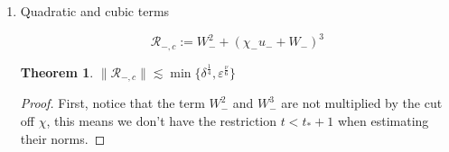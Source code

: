 \documentclass[letterpaper,11pt]{article}
\newcommand{\rmO}{\mathcal{O}}
\newcommand{\eps}{\varepsilon}
\newcommand{\lar}{ \lesssim }
\numberwithin{equation}{section}
\theoremstyle{plain}
\newtheorem{theorem}{Theorem}[section]
\begin{document}
\begin{enumerate}
\begin{itemize}
\begin{enumerate}
\begin{proof}
For $0<t<\eps^{-1}\delta$, where the weight $I(t) $ equals $[\delta^{-\frac{1}{4}} (\delta -\eps t)^{\frac{3}{2}}+\delta^{\frac{1}{4}}\eps^{\frac{2}{3}}]^{-1}$, it is convenient to write the term $T_\infty -t$ as follows:
\[
T_\infty -t = \eps^{-1}\delta + \eps^{-\frac{1}{3}}\Omega_0 - t  = \eps^{-1}\left[(\delta -\eps t) +\eps^{\frac{2}{3}}\Omega_0\right].
\]

It then follows that
\begin{align*}
|I(t)\chi_- u_+ W_+|_\infty &\lar I(t)(T_\infty - t)^{-(1+\eta)} \lar I(\eps^{-1}\delta)(T_\infty - \eps^{-1}\delta)^{-(1+\eta)} \\
&\lar \eps^{-\frac{2}{3}} \eps^{\frac{1+\eta}{3}} = \rmO(\eps^{\frac{\eta-1}{3}} ).
\end{align*}
Then we apply the claim to $I(t)\chi_-u_-W_+$
\begin{align*}
|I(t)\chi_- u_- W_+|_\infty  &\lar \frac{\sqrt{\delta-\eps t}+\eps^{1/3}}{ \delta^{-\frac{1}{4}}(\delta-\eps t)^{\frac{3}{2}} + \delta^{\frac{1}{4}}\eps^{2/3}} (T_\infty - \eps^{-1}\delta)^{-\eta} \\
& = \frac{\sqrt{\delta-\eps t}+\eps^{1/3}}{ \delta^{-\frac{1}{4}}(\delta-\eps t)^{\frac{3}{2}} + \delta^{\frac{1}{4}}\eps^{2/3}} \frac{\eps^{\eta}}{(\delta -\eps t +\eps^{\frac{2}{3}}\Omega_0)^\eta}\\
&= \dfrac{(\delta \beta)^{1/2} + \eps^{1/3}} {(\delta \beta)^{3/2} + \eps^{2/3}} \dfrac{\eps^\eta}{(\delta \beta + \eps^{2/3} \Omega_0 )^{\eta} }\\
& \lar \dfrac{1} {(\delta \beta)^{3/2} + \eps^{2/3}} \dfrac{\eps^\eta}{( (\delta \beta)^{1/2} + \eps^{1/3} )^{2\eta -1} } \\
& \lar \eps^{\eta}\eps^{-\frac{2}{3}}\eps^{\frac{1-2\eta}{3}} = \eps^{\frac{\eta-1}{3}}
\end{align*}
where $\beta = 1-\eps \delta^{-1}t$.
\end{proof}




\item  Quadratic and cubic terms

\[
\mathcal{R}_{-,c}:= W_-^2 +(\chi_- u_- +W_-)^3 
\]

\begin{theorem}
$\|\mathcal{R}_{-,c}\| \lar \min\{ \delta^{\frac{1}{4}},\eps^{\frac{\nu}{6}}\}$
\end{theorem}

\begin{proof}
First, notice that the term $W_-^2$ and $W_-^3$ are not multiplied by the cut off $\chi$, this means we don't have the restriction $t<t_*+1$ when estimating their norms.


\end{proof}
\end{enumerate}
\end{itemize}
\end{enumerate}
\end{document}
